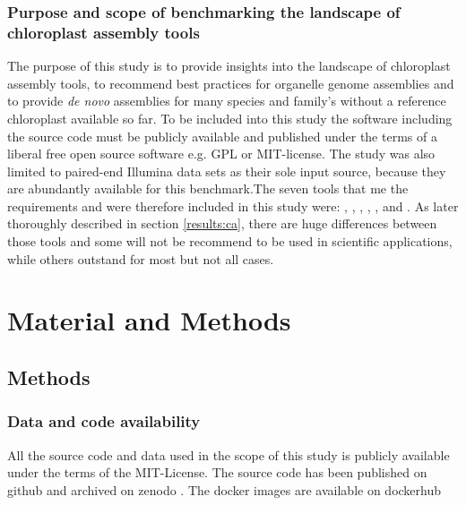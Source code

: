 \subsubsection{Purpose and scope of benchmarking the landscape of chloroplast assembly tools}

The purpose of this study is to provide insights into the landscape of chloroplast assembly tools, to recommend best practices for organelle genome assemblies and to provide \textit{de novo} assemblies for many species and family's without a reference chloroplast available so far.
To be included into this study the software including the source code must be publicly available and published under the terms of a liberal free open source software e.g. GPL or MIT-license. The study was also limited to paired-end Illumina data sets as their sole input source, because they are abundantly available for this benchmark.The seven tools that me the requirements and were therefore included in this study were: \ce, \oa, \fp, \ioga, \np, \go and \cassp. As later thoroughly described in section \ref{results:ca}, there are huge differences between those tools and some will not be recommend to be used in scientific applications, while others outstand for most but not all cases.


\section{Material and Methods}
\subsection{Methods}
\subsubsection{Data and code availability}
All the source code and data used in the scope of this study is publicly available under the terms of the MIT-License. The source code has been published on github \cite{github-benchmark-repo} and archived on zenodo \cite{zenodorepo} . The docker images are available on dockerhub \cite{dockerhub-benchmark}

